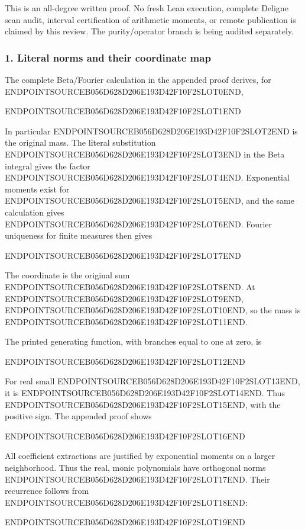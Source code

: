 This is an all-degree written proof. No fresh Lean execution, complete Deligne scan audit, interval certification of arithmetic moments, or remote publication is claimed by this review. The purity/operator branch is being audited separately.

\subsubsection{1. Literal norms and their coordinate map}\label{endpoint-gamma_review--literal-norms-and-their-coordinate-map}

The complete Beta/Fourier calculation in the appended proof derives, for ENDPOINTSOURCEB056D628D206E193D42F10F2SLOT0END,

ENDPOINTSOURCEB056D628D206E193D42F10F2SLOT1END

In particular ENDPOINTSOURCEB056D628D206E193D42F10F2SLOT2END is the original mass. The literal substitution ENDPOINTSOURCEB056D628D206E193D42F10F2SLOT3END in the Beta integral gives the factor ENDPOINTSOURCEB056D628D206E193D42F10F2SLOT4END. Exponential moments exist for ENDPOINTSOURCEB056D628D206E193D42F10F2SLOT5END, and the same calculation gives ENDPOINTSOURCEB056D628D206E193D42F10F2SLOT6END. Fourier uniqueness for finite measures then gives

ENDPOINTSOURCEB056D628D206E193D42F10F2SLOT7END

The coordinate is the original sum ENDPOINTSOURCEB056D628D206E193D42F10F2SLOT8END. At ENDPOINTSOURCEB056D628D206E193D42F10F2SLOT9END, ENDPOINTSOURCEB056D628D206E193D42F10F2SLOT10END, so the mass is ENDPOINTSOURCEB056D628D206E193D42F10F2SLOT11END.

The printed generating function, with branches equal to one at zero, is

ENDPOINTSOURCEB056D628D206E193D42F10F2SLOT12END

For real small ENDPOINTSOURCEB056D628D206E193D42F10F2SLOT13END, it is ENDPOINTSOURCEB056D628D206E193D42F10F2SLOT14END. Thus ENDPOINTSOURCEB056D628D206E193D42F10F2SLOT15END, with the positive sign. The appended proof shows

ENDPOINTSOURCEB056D628D206E193D42F10F2SLOT16END

All coefficient extractions are justified by exponential moments on a larger neighborhood. Thus the real, monic polynomials have orthogonal norms ENDPOINTSOURCEB056D628D206E193D42F10F2SLOT17END. Their recurrence follows from ENDPOINTSOURCEB056D628D206E193D42F10F2SLOT18END:

ENDPOINTSOURCEB056D628D206E193D42F10F2SLOT19END

